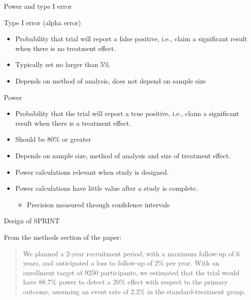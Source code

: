 \documentclass[ignorenonframetext,]{beamer}
\begin{document}
\begin{frame}{Power and type I error}

Type I error (alpha error)

\begin{itemize}
\item
  Probability that trial will report a false positive, i.e., claim a
  significant result when there is no treatment effect.
\item
  Typically set no larger than 5\%
\item
  Depends on method of analysis, does not depend on sample size
\end{itemize}

Power

\begin{itemize}
\item
  Probability that the trial will report a true positive, i.e., claim a
  significant result when there is a treatment effect.
\item
  Should be 80\% or greater
\item
  Depends on sample size, method of analysis and size of treatment
  effect.
\item
  Power calculations relevant when study is designed.
\item
  Power calculations have little value after a study is complete.

  \begin{itemize}
  \itemsep1pt\parskip0pt
  \item
    Precision measured through confidence intervals
  \end{itemize}
\end{itemize}

\end{frame}

\begin{frame}{Design of SPRINT}

From the methods section of the paper:

\begin{quote}
We planned a 2-year recruitment period, with a maximum follow-up of 6 years, and anticipated a loss to follow-up of 2\% per year. With an enrollment target of 9250 participants, we estimated  that the trial would have 88.7\% power to detect  a 20\% effect with respect to the primary outcome, assuming an event rate of 2.2\% in the standard-treatment group.
\end{quote}

\end{frame}
\end{document}
